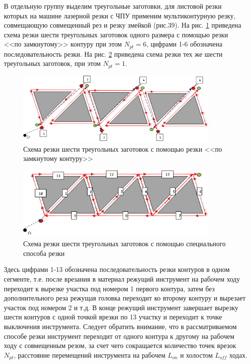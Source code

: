 \documentclass[11pt,twoside]{report}
\begin{document}
В отдельную группу выделим треугольные заготовки,
для листовой резки которых на машине лазерной резки с ЧПУ
применим мультиконтурную резку,
совмещающую совмещенный рез и резку змейкой (рис.39).
На рис. \ref{6-6} приведена схема резки шести треугольных заготовок
одного размера с помощью резки <<по замкнутому>> контуру при этом
$N_{pt}=6$,
цифрами 1-6 обозначена последовательность резки.
На рис. \ref{6-1} приведена схема резки тех же шести
треугольных заготовок, при этом
$N_{pt}=1$.

\begin{figure}
  \begin{center}
  \includegraphics[width=0.9\textwidth]{6-6.png}
  \caption{Схема резки шести треугольных заготовок с помощью резки <<по замкнутому контуру>>}
  \label{6-6}
  \end{center}
\end{figure}

\begin{figure}
  \begin{center}
  \includegraphics[width=0.9\textwidth]{6-1.png}
  \caption{Схема резки шести треугольных заготовок с помощью специального способа резки}
  \label{6-1}
  \end{center}
\end{figure}

Здесь цифрами 1-13 обозначена последовательность
резки контуров в одном сегменте,
т.е. после врезания в материал режущий инструмент
на рабочем ходу переходит к вырезке участка под номером 1
первого контура,
затем без дополнительного реза режущая головка
переходит ко второму контуру и вырезает участок под номером 2 и т.д.
В конце режущий инструмент завершает вырезку шести контуров
с одной точкой врезки по 13 участку и переходит к
точке выключения инструмента.
Следует обратить внимание, что в рассматриваемом способе
резки инструмент переходит от одного контура к другому
на рабочем ходу с совмещенным резом,
за счет чего сокращается количество точек врезок $N_{pt}$,
расстояние перемещений инструмента на рабочем $L_{on}$
и холостом  $L_{off}$ ходах.
\end{document}
